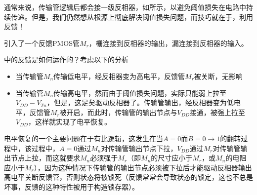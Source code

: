 通常来说，传输管逻辑后都会接一级反相器，如所示，以避免阈值损失在电路中持续传递。但是，我们仍然想从根源上彻底解决阈值损失问题，而技巧就在于，利用反馈！

引入了一个反馈PMOS管$M_r$，栅连接到反相器的输出，漏连接到反相器的输入。\goodbreak

中的反馈是如何运作的？考虑以下的分析\nopagebreak
\begin{itemize}
    \item 当传输管$M_n$传输低电平，经反相器变为高电平，反馈管$M_r$被关断，无影响
    \item 当传输管$M_n$传输高电平，然而由于阈值损失问题，实际只能弱上拉至$V_{DD}-V_{Tn}$，但是，这足矣驱动反相器了。传输管输出，经反相器变为低电平，反馈管$M_r$被开启，而此时，传输管的输出节点与$V_{DD}$接通，被强上拉至$V_{DD}$，这样就实现了电平恢复。
\end{itemize}
电平恢复的一个主要问题在于有比逻辑，这发生在当$A=0$而$B=0\to 1$的翻转过程中，该过程中，$A=0$通过$M_n$对传输管输出节点下拉，$V_{DD}$通过$M_r$对传输管输出节点上拉，而这就要求$M_n$必须强于$M_r$（即$M_n$的尺寸应小于$M_r$，或$M_n$的电阻应小于$M_r$），因为这种情况下传输管的输出节点必须被下拉后才能驱动反相器输出高电平关断反馈管，否则状态将被锁死（反馈常常会导致状态的锁定，这也不总是坏事，反馈的这种特性被用于构造锁存器）。